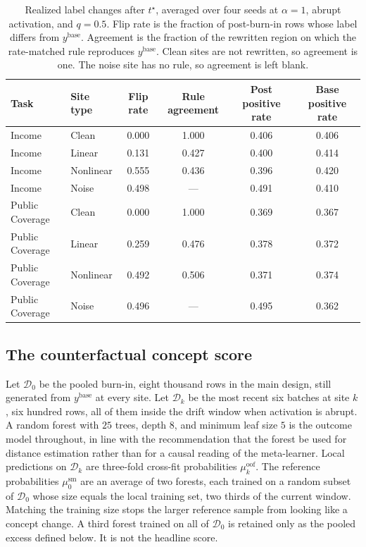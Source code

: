 \begin{table}[t]
\centering
\caption{Realized label changes after $t^\star$, averaged over four seeds
at $\alpha=1$, abrupt activation, and $q=0.5$.
Flip rate is the fraction of post-burn-in rows whose label differs from
$y^{\mathrm{base}}$.
Agreement is the fraction of the rewritten region on which the rate-matched
rule reproduces $y^{\mathrm{base}}$.
Clean sites are not rewritten, so agreement is one.
The noise site has no rule, so agreement is left blank.}
\label{tab:dgp-check}
\begin{tabular}{llcccc}
\toprule
Task & Site type & Flip rate & Rule agreement & Post positive rate & Base positive rate \\
\midrule
Income & Clean & 0.000 & 1.000 & 0.406 & 0.406 \\
Income & Linear & 0.131 & 0.427 & 0.400 & 0.414 \\
Income & Nonlinear & 0.555 & 0.436 & 0.396 & 0.420 \\
Income & Noise & 0.498 & --- & 0.491 & 0.410 \\
Public Coverage & Clean & 0.000 & 1.000 & 0.369 & 0.367 \\
Public Coverage & Linear & 0.259 & 0.476 & 0.378 & 0.372 \\
Public Coverage & Nonlinear & 0.492 & 0.506 & 0.371 & 0.374 \\
Public Coverage & Noise & 0.496 & --- & 0.495 & 0.362 \\
\bottomrule
\end{tabular}
\end{table}

\subsection{The counterfactual concept score}
\label{sec:delta-cf}

Let $\mathcal{D}_0$ be the pooled burn-in, eight thousand rows in the main
design, still generated from $y^{\mathrm{base}}$ at every site.
Let $\mathcal{D}_k$ be the most recent six batches at site $k$, six hundred
rows, all of them inside the drift window when activation is abrupt.
A random forest with $25$ trees, depth $8$, and minimum leaf size $5$ is
the outcome model throughout, in line with the recommendation that the
forest be used for distance estimation rather than for a causal reading of
the meta-learner.
Local predictions on $\mathcal{D}_k$ are three-fold cross-fit probabilities
$\mu_k^{\mathrm{oof}}$.
The reference probabilities $\mu_0^{\mathrm{sm}}$ are an average of two
forests, each trained on a random subset of $\mathcal{D}_0$ whose size
equals the local training set, two thirds of the current window.
Matching the training size stops the larger reference sample from looking
like a concept change.
A third forest trained on all of $\mathcal{D}_0$ is retained only as the
pooled excess defined below.
It is not the headline score.

